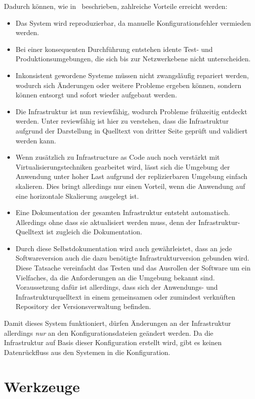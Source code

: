 Dadurch können, wie in~\autocite[64\psqq]{Wolff201604} beschrieben, zahlreiche Vorteile erreicht werden:
\begin{itemize}
    \item Das System wird reproduzierbar, da manuelle Konfigurationsfehler vermieden werden.
    \item Bei einer konsequenten Durchführung entstehen idente Test- und Produktionsumgebungen, die sich bis zur Netzwerkebene nicht unterscheiden.
    \item Inkonsistent gewordene Systeme müssen nicht zwangsläufig repariert werden, wodurch sich Änderungen oder weitere Probleme ergeben können, sondern können entsorgt und sofort wieder aufgebaut werden.
    \item Die Infrastruktur ist nun reviewfähig, wodurch Probleme frühzeitig entdeckt werden. Unter reviewfähig ist hier zu verstehen, dass die Infrastruktur aufgrund der Darstellung in Quelltext von dritter Seite geprüft und validiert werden kann.
    \item Wenn zusätzlich zu Infrastructure as Code auch noch verstärkt mit Virtualisierungstechniken gearbeitet wird, lässt sich die Umgebung der Anwendung unter hoher Last aufgrund der replizierbaren Umgebung einfach skalieren. Dies bringt allerdings nur einen Vorteil, wenn die Anwendung auf eine horizontale Skalierung ausgelegt ist.
    \item Eine Dokumentation der gesamten Infrastruktur entsteht automatisch. Allerdings ohne dass sie aktualisiert werden muss, denn der Infrastruktur-Quelltext ist zugleich die Dokumentation.
    \item Durch diese Selbstdokumentation wird auch gewährleistet, dass an jede Softwareversion auch die dazu benötigte Infrastrukturversion gebunden wird. Diese Tatsache vereinfacht das Testen und das Ausrollen der Software um ein Vielfaches, da die Anforderungen an die Umgebung bekannt sind. Voraussetzung dafür ist allerdings, dass sich der Anwendungs- und Infrastrukturquelltext in einem gemeinsamen oder zumindest verknüften Repository der Versionsverwaltung befinden.
\end{itemize}
Damit dieses System funktioniert, dürfen Änderungen an der Infrastruktur allerdings \emph{nur} an den Konfigurationsdateien geändert werden. Da die Infrastruktur auf Basis dieser Konfiguration erstellt wird, gibt es keinen Datenrückfluss aus den Systemen in die Konfiguration.


\section{Werkzeuge}
\label{sec:konfigurationswerkzeuge}
